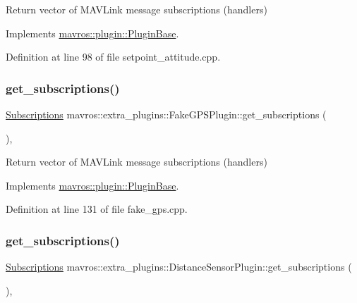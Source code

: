 Return vector of M\+A\+V\+Link message subscriptions (handlers) 



Implements \mbox{\hyperlink{group__plugin_gaf4e23fec6d7436a62cbf0942a2e5791c}{mavros\+::plugin\+::\+Plugin\+Base}}.



Definition at line 98 of file setpoint\+\_\+attitude.\+cpp.

\mbox{\label{group__plugin_ga19cf673f75e3612d3e8d7b2cd316165e}} 
\subsubsection{\texorpdfstring{get\_subscriptions()}{get\_subscriptions()}\hspace{0.1cm}{\footnotesize\ttfamily [35/41]}}
{\footnotesize\ttfamily \mbox{\hyperlink{group__plugin_ga8967d61fc77040e0c3ea5a4585d62a09}{Subscriptions}} mavros\+::extra\+\_\+plugins\+::\+Fake\+G\+P\+S\+Plugin\+::get\+\_\+subscriptions (\begin{DoxyParamCaption}{ }\end{DoxyParamCaption})\hspace{0.3cm}{\ttfamily [inline]}, {\ttfamily [virtual]}}



Return vector of M\+A\+V\+Link message subscriptions (handlers) 



Implements \mbox{\hyperlink{group__plugin_gaf4e23fec6d7436a62cbf0942a2e5791c}{mavros\+::plugin\+::\+Plugin\+Base}}.



Definition at line 131 of file fake\+\_\+gps.\+cpp.

\mbox{\label{group__plugin_gafe36c8c7308353863b1a33f4ca497159}} 
\subsubsection{\texorpdfstring{get\_subscriptions()}{get\_subscriptions()}\hspace{0.1cm}{\footnotesize\ttfamily [36/41]}}
{\footnotesize\ttfamily \mbox{\hyperlink{group__plugin_ga8967d61fc77040e0c3ea5a4585d62a09}{Subscriptions}} mavros\+::extra\+\_\+plugins\+::\+Distance\+Sensor\+Plugin\+::get\+\_\+subscriptions (\begin{DoxyParamCaption}{ }\end{DoxyParamCaption})\hspace{0.3cm}{\ttfamily [inline]}, {\ttfamily [virtual]}}



